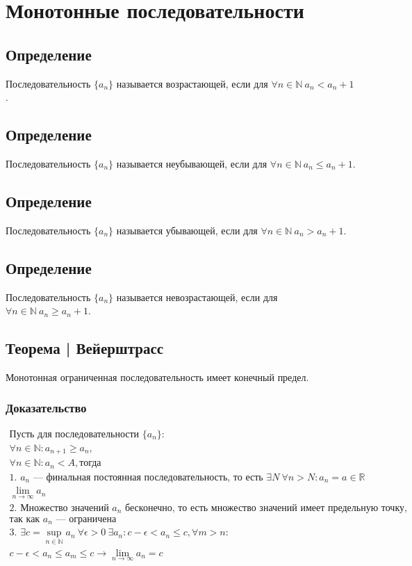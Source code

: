 \documentclass{article}
\begin{document}
\section{Монотонные последовательности}

\subsection{Определение}
Последовательность $\{a_n\}$ называется возрастающей, если для $\forall n \in \mathbb{N} ~ a_n < a_n+1$.


\subsection{Определение}
Последовательность $\{a_n\}$ называется неубывающей, если для $\forall n \in \mathbb{N} ~ a_n \le a_n+1$.


\subsection{Определение}
Последовательность $\{a_n\}$ называется убывающей, если для $\forall n \in \mathbb{N} ~ a_n > a_n+1$.


\subsection{Определение}
Последовательность $\{a_n\}$ называется невозрастающей, если для $\forall n \in \mathbb{N} ~ a_n \ge a_n+1$.


\subsection{Теорема | Вейерштрасс}
Монотонная ограниченная последовательность имеет конечный предел.

\subsubsection{Доказательство}
\begin{gather*}
    \text{Пусть для последовательности } \{a_n\}: \\
    \forall{n} \in \mathbb{N}: a_{n+1} \ge a_n, \\
    \forall{n} \in \mathbb{N}: a_n < A, \text{тогда} \\
    \text{1. } a_n \text{ --- финальная постоянная последовательность, то есть } \exists{N} ~ \forall{n} > N: a_n = a \in \mathbb{R} \\
    \lim_{n\to\infty} a_n \\
    \text{2. Множество значений } a_n \text{ бесконечно, то есть множество значений имеет предельную точку,} \\ 
    \text{так как $a_n$ --- ограничена} \\
    \text{3. } \exists c = \sup_{n \in \mathbb{N}} a_n ~ \forall \epsilon > 0 ~ \exists a_n: c - \epsilon < a_n \le c, \forall m > n: \\
    c - \epsilon < a_n \le a_m \le c \rightarrow \lim_{n \to \infty} a_n = c
\end{gather*}
\end{document}
